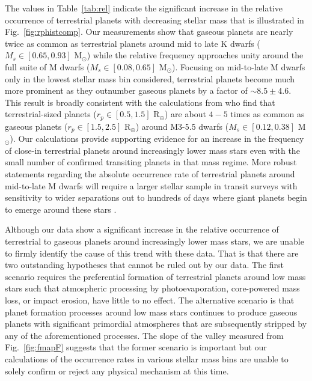 \documentclass[twocolumn]{emulateapj}
\begin{document}


The values in Table~\ref{tab:rel} indicate the significant increase in the relative occurrence of terrestrial
planets with decreasing stellar mass that is illustrated in Fig.~\ref{fig:rphistcomp}. Our measurements show
that gaseous planets are nearly twice as common as terrestrial planets
around mid to late K dwarfs ($M_s \in [0.65,0.93]$ M$_{\odot}$) while the relative frequency approaches unity
around the full suite of M dwarfs ($M_s \in [0.08,0.65]$ M$_{\odot}$). Focusing on mid-to-late M dwarfs only in
the lowest stellar mass bin considered, terrestrial planets become much more prominent as they outnumber gaseous
planets by a factor of $\sim 8.5\pm 4.6$. This result is broadly
consistent with the calculations from \cite{hardegree19} who find that terrestrial-sized 
planets ($r_p \in[0.5,1.5]$ R$_{\oplus}$) are about $4-5$ times as common as gaseous planets ($r_p \in [1.5,2.5]$
R$_{\oplus}$) around M3-5.5 dwarfs ($M_s \in [0.12,0.38]$ M$_{\odot}$). 
Our calculations provide supporting evidence for an increase in the frequency of close-in terrestrial planets
around increasingly lower mass stars even with the small number of confirmed transiting planets in that mass
regime. More robust statements regarding the absolute occurrence rate of terrestrial planets around mid-to-late
M dwarfs will require a larger stellar sample in transit surveys with sensitivity to wider separations out to
hundreds of days where giant planets begin to emerge around these stars \citep{bonfils13,morales19}.

Although our data show a significant increase in the relative occurrence of terrestrial to gaseous planets
around increasingly lower mass stars, we are unable to firmly identify the cause of this trend with these data.
That is that there are two outstanding hypotheses that cannot be ruled out by our data. The first scenario
requires the preferential formation of terrestrial planets around low mass stars such that atmospheric processing
by photoevaporation, core-powered mass loss, or impact erosion, have little to no effect. The alternative scenario
is that planet formation processes around low mass stars continues to produce gaseous planets with significant
primordial atmospheres that are subsequently stripped by any of the aforementioned processes. The slope of the
valley measured from Fig.~\ref{fig:fmapF} suggests that the former scenario is important but our calculations of
the occurrence rates in various stellar mass bins are unable to solely confirm or reject any physical mechanism
at this time. 
\end{document}
